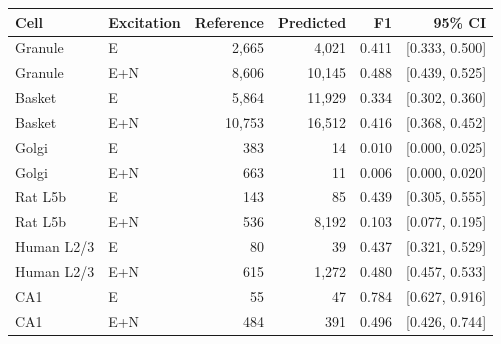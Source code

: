 \begin{tabular}{llrrrr}
\toprule
Cell & Excitation & Reference & Predicted & F1 & 95\% CI\\
\midrule
Granule & E & 2,665 & 4,021 & 0.411 & [0.333, 0.500] \\
Granule & E+N & 8,606 & 10,145 & 0.488 & [0.439, 0.525] \\
Basket & E & 5,864 & 11,929 & 0.334 & [0.302, 0.360] \\
Basket & E+N & 10,753 & 16,512 & 0.416 & [0.368, 0.452] \\
Golgi & E & 383 & 14 & 0.010 & [0.000, 0.025] \\
Golgi & E+N & 663 & 11 & 0.006 & [0.000, 0.020] \\
Rat L5b & E & 143 & 85 & 0.439 & [0.305, 0.555] \\
Rat L5b & E+N & 536 & 8,192 & 0.103 & [0.077, 0.195] \\
Human L2/3 & E & 80 & 39 & 0.437 & [0.321, 0.529] \\
Human L2/3 & E+N & 615 & 1,272 & 0.480 & [0.457, 0.533] \\
CA1 & E & 55 & 47 & 0.784 & [0.627, 0.916] \\
CA1 & E+N & 484 & 391 & 0.496 & [0.426, 0.744] \\
\bottomrule
\end{tabular}
